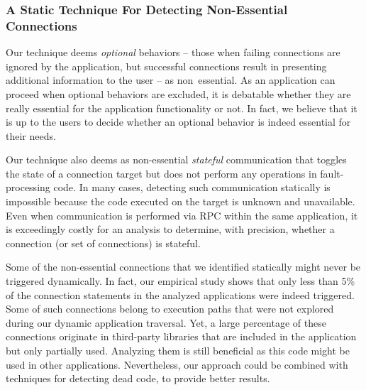 \subsubsection{A Static Technique For Detecting Non-Essential Connections}
Our technique deems \emph{optional} behaviors -- those when failing connections are ignored by the application, but successful connections result in presenting additional information to the user -- as non~essential. 
As an application can proceed when optional behaviors are excluded, it is debatable whether they are really essential for the application functionality or not. 
In fact, we believe that it is up to the users to decide whether an optional behavior is indeed essential for their needs. 

Our technique also deems as non-essential \emph{stateful} communication that toggles
the state of a connection target but does not perform any operations in
fault-processing code. In many cases, detecting such
communication statically is impossible because the code executed on
the target is unknown and unavailable.  Even when communication is
performed via RPC within the same application, it is exceedingly
costly for an analysis to determine, with precision, whether a
connection (or set of connections) is stateful. 
 
Some of the non-essential connections that we identified statically might never be triggered dynamically. In fact, our empirical study shows that only less than 5\% of the connection statements in the analyzed applications were indeed triggered.
Some of such connections belong to execution paths that were not explored during our dynamic application traversal.
Yet, a large percentage of these connections originate in  
third-party libraries that are included in the application but only partially used. 
Analyzing them is still beneficial as this code might be used in other applications.
Nevertheless, our approach could be combined with techniques for detecting dead code, to provide better results.
